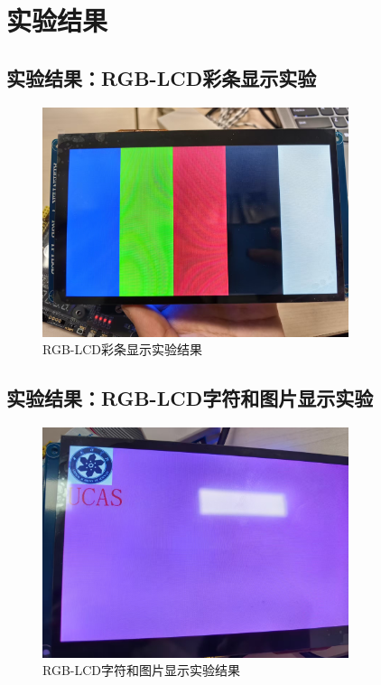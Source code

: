 \documentclass[UTF8]{article}
\theoremstyle{MyLineTheoremStyle} %
\theoremstyle{MyBlockTheoremStyle} %
\theoremstyle{MySubsubsectionStyle} %
\begin{document}
\cleardoublepage

\section{实验结果}

\subsection{实验结果：RGB-LCD彩条显示实验}
\noindent
\begin{figure}[H]
    \centering
    \includegraphics[width=0.8\textwidth]{colorbar.jpg}
    \caption{RGB-LCD彩条显示实验结果}
    \label{fig:彩条显示实验结果}
\end{figure}


\subsection{实验结果：RGB-LCD字符和图片显示实验}
\noindent
\begin{figure}[H]
    \centering
    \includegraphics[width=0.8\textwidth]{UCASLOGO_UCAS.jpg}
    \caption{RGB-LCD字符和图片显示实验结果}
    \label{fig:RGB-LCD字符和图片显示实验结果}
\end{figure}
\end{document}
